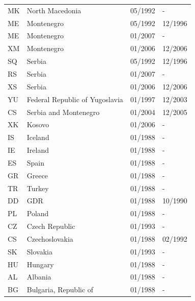 \begin{footnotesize}
\begin{longtable}{p{0.5cm}p{9cm}p{2cm}p{2cm}}
MK	&	North Macedonia	&	05/1992	&	-	\\

ME	&	Montenegro	&	05/1992	&	12/1996	\\

ME	&	Montenegro	&	01/2007	&	-	\\

XM	&	Montenegro	&	01/2006	&	12/2006	\\

SQ	&	Serbia	&	05/1992	&	12/1996	\\

RS	&	Serbia	&	01/2007	&	-	\\

XS	&	Serbia	&	01/2006	&	12/2006	\\

YU	&	Federal Republic of Yugoslavia	&	01/1997	&	12/2003	\\

CS	&	Serbia and Montenegro	&	01/2004	&	12/2005	\\

XK	&	Kosovo	&	01/2006	&	-	\\

IS	&	Iceland	&	01/1988	&	-	\\

IE	&	Ireland	&	01/1988	&	-	\\

ES	&	Spain	&	01/1988	&	-	\\

GR	&	Greece	&	01/1988	&	-	\\

TR	&	Turkey	&	01/1988	&	-	\\

DD	&	GDR	&	01/1988	&	10/1990	\\

PL	&	Poland	&	01/1988	&	-	\\

CZ	&	Czech Republic	&	01/1993	&	-	\\

CS	&	Czechoslovakia	&	01/1988	&	02/1992	\\

SK	&	Slovakia	&	01/1993	&	-	\\

HU	&	Hungary	&	01/1988	&	-	\\

AL	&	Albania	&	01/1988	&	-	\\

BG	&	Bulgaria, Republic of	&	01/1988	&	-	\\


\end{longtable}
\end{footnotesize}
